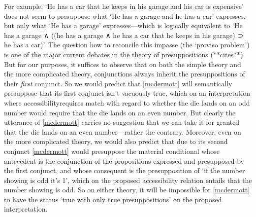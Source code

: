 \documentclass[If.tex]{subfiles}
\begin{document}
For example, ‘He has a car that he keeps in his garage and his car is expensive’ does not seem to presuppose what ‘He has a garage and he has a car’ expresses, but only what ‘He has a garage’ expresses---which is logically equivalent to ‘He has a garage ∧ ((he has a garage ∧ he has a car that he keeps in his garage) ⊃ he has a car)’.  The question how to reconcile this impasse (the ‘proviso problem’) is one of the major current debates in the theory of presuppositions (**cites**).  But for our purposes, it suffices to observe that on both the simple theory and the more complicated theory, conjunctions always inherit the presuppositions of their \emph{first} conjunct.  So we would predict that \ref{mcdermott} will semantically presuppose that its first conjunct isn't vacuously true, which on an interpretation where accessibilityrequires match with regard to whether the die lands on an odd number would require that the die lands on an even number.  But clearly the utterance of \ref{mcdermott} carries no suggestion that we can take it for granted that the die lands on an even number---rather the contrary.   Moreover, even on the more complicated theory, we would also predict that due to its second conjunct \ref{mcdermott} would presuppose the material conditional whose antecedent is the conjunction of the propositions expressed and presupposed by the first conjunct, and whose consequent is the presupposition of ‘if the number showing is odd it's 1’, which on the proposed accessibility relation entails that the number showing is odd.  So on either theory, it will be impossible for \ref{mcdermott} to have the status ‘true with only true presuppositions’ on the proposed interpretation.  
\end{document}
